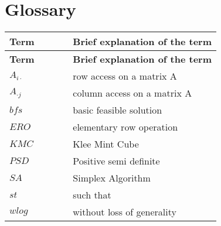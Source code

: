 \documentclass[main]{subfiles}
\begin{document}
\section{Glossary}
\renewcommand{\arraystretch}{1.5}


\begin{longtable}{p{0.3\linewidth} p{0.7\linewidth}}
\hline \textbf{Term} & \textbf{Brief explanation of the term}\\ \hline
\endfirsthead

\hline \textbf{Term} & \textbf{Brief explanation of the term}\\ \hline\hline
\endhead
$A_{i\cdot}$ & row access on a matrix A\\
$A_{\cdot j}$ & column access on a matrix A\\
$bfs$ & basic feasible solution\\
$ERO$ & elementary row operation\\
$KMC$ & Klee Mint Cube\\
$PSD$ & Positive semi definite\\
$SA$ & Simplex Algorithm\\
$st$ & such that\\
$wlog$ & without loss of generality\\

\end{longtable}
\end{document}

